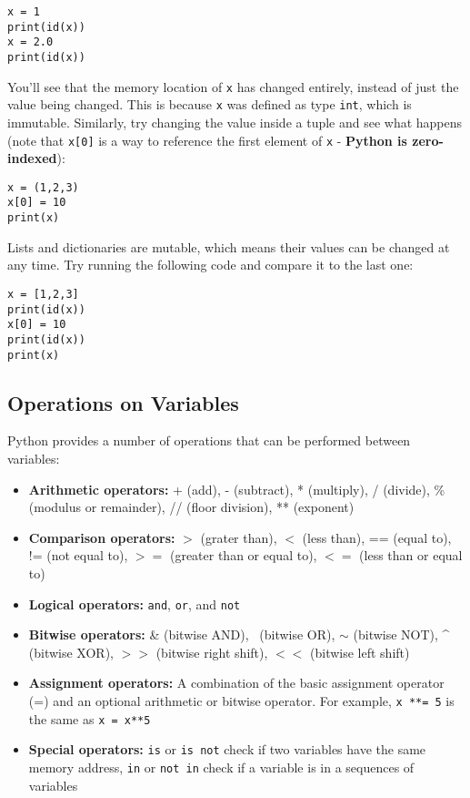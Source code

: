\documentclass[12pt]{article}
\newcommand{\code}{\texttt}
\begin{document}
\begin{lstlisting}[frame=single] 
x = 1
print(id(x))
x = 2.0
print(id(x))
\end{lstlisting}

You'll see that the memory location of \code{x} has changed entirely, instead of just the value being changed. This is because \code{x} was defined as type \code{int}, which is immutable. Similarly, try changing the value inside a tuple and see what happens (note that \code{x[0]} is a way to reference the first element of \code{x} - \textbf{Python is zero-indexed}):

\begin{lstlisting}[frame=single] 
x = (1,2,3)
x[0] = 10
print(x)
\end{lstlisting}

Lists and dictionaries are mutable, which means their values can be changed at any time. Try running the following code and compare it to the last one: 

\begin{lstlisting}[frame=single] 
x = [1,2,3]
print(id(x))
x[0] = 10
print(id(x))
print(x)
\end{lstlisting}

\subsection{Operations on Variables}
Python provides a number of operations that can be performed between variables:

\begin{itemize}
	\item \textbf{Arithmetic operators:} + (add), - (subtract), * (multiply), / (divide), \% (modulus or remainder), // (floor division), ** (exponent)
	\item \textbf{Comparison operators:} $>$ (grater than), $<$ (less than), == (equal to), != (not equal to), $>=$ (greater than or equal to), $<=$ (less than or equal to)
	\item \textbf{Logical operators:} \code{and}, \code{or}, and \code{not}
	\item \textbf{Bitwise operators:} \& (bitwise AND), \textbar\ (bitwise OR), $\sim$ (bitwise NOT), \string^ (bitwise XOR), $>>$ (bitwise right shift), $<<$ (bitwise left shift)
	\item \textbf{Assignment operators:} A combination of the basic assignment operator (=) and an optional arithmetic or bitwise operator. For example, \code{x **= 5} is the same as \code{x = x**5}
	\item \textbf{Special operators:} \code{is} or \code{is not} check if two variables have the same memory address, \code{in} or \code{not in} check if a variable is in a sequences of variables
\end{itemize}
\end{document}
